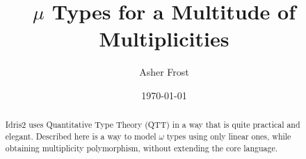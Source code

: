 \documentclass{article}
\begin{document}
\title{$\mu$ Types for a Multitude of Multiplicities}
\author{Asher Frost}
\date{\today}
\maketitle	
	
\begin{abstract}
	Idris2 uses Quantitative Type Theory (QTT) in a way that is quite practical and elegant.
	Described here is a way to model $\omega$ types using only linear ones, while obtaining multiplicity polymorphism, without extending the core language.
\end{abstract}	

\listoftodos
\tableofcontents


\printbibliography
\end{document}
